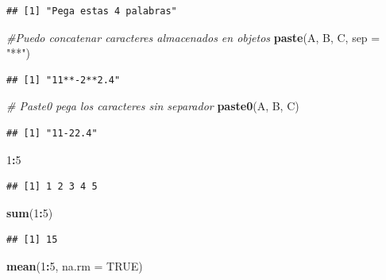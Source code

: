 \documentclass[]{book}
\newenvironment{Shaded}{\begin{snugshade}}{\end{snugshade}}
\newcommand{\CommentTok}[1]{\textcolor[rgb]{0.56,0.35,0.01}{\textit{#1}}}
\newcommand{\DataTypeTok}[1]{\textcolor[rgb]{0.13,0.29,0.53}{#1}}
\newcommand{\DecValTok}[1]{\textcolor[rgb]{0.00,0.00,0.81}{#1}}
\newcommand{\KeywordTok}[1]{\textcolor[rgb]{0.13,0.29,0.53}{\textbf{#1}}}
\newcommand{\NormalTok}[1]{#1}
\newcommand{\OperatorTok}[1]{\textcolor[rgb]{0.81,0.36,0.00}{\textbf{#1}}}
\newcommand{\OtherTok}[1]{\textcolor[rgb]{0.56,0.35,0.01}{#1}}
\newcommand{\StringTok}[1]{\textcolor[rgb]{0.31,0.60,0.02}{#1}}
\begin{document}
\begin{verbatim}
## [1] "Pega estas 4 palabras"
\end{verbatim}

\begin{Shaded}
\begin{Highlighting}[]
\CommentTok{#Puedo concatenar caracteres almacenados en objetos}
\KeywordTok{paste}\NormalTok{(A, B, C, }\DataTypeTok{sep =} \StringTok{"**"}\NormalTok{)}
\end{Highlighting}
\end{Shaded}

\begin{verbatim}
## [1] "11**-2**2.4"
\end{verbatim}

\begin{Shaded}
\begin{Highlighting}[]
\CommentTok{# Paste0 pega los caracteres sin separador}
\KeywordTok{paste0}\NormalTok{(A, B, C)}
\end{Highlighting}
\end{Shaded}

\begin{verbatim}
## [1] "11-22.4"
\end{verbatim}

\begin{Shaded}
\begin{Highlighting}[]
\DecValTok{1}\OperatorTok{:}\DecValTok{5}
\end{Highlighting}
\end{Shaded}

\begin{verbatim}
## [1] 1 2 3 4 5
\end{verbatim}

\begin{Shaded}
\begin{Highlighting}[]
\KeywordTok{sum}\NormalTok{(}\DecValTok{1}\OperatorTok{:}\DecValTok{5}\NormalTok{)}
\end{Highlighting}
\end{Shaded}

\begin{verbatim}
## [1] 15
\end{verbatim}

\begin{Shaded}
\begin{Highlighting}[]
\KeywordTok{mean}\NormalTok{(}\DecValTok{1}\OperatorTok{:}\DecValTok{5}\NormalTok{, }\DataTypeTok{na.rm =} \OtherTok{TRUE}\NormalTok{)}
\end{Highlighting}
\end{Shaded}
\end{document}
